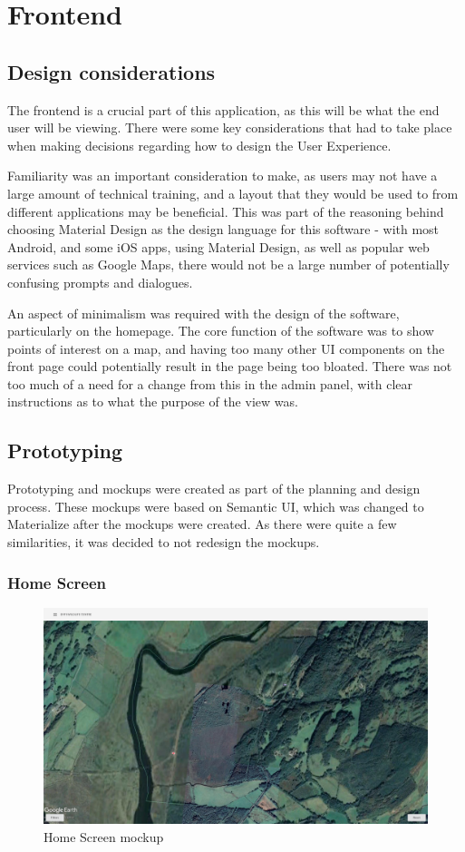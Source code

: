 \section{Frontend}
\label{sec:frontend}

\subsection{Design considerations}

The frontend is a crucial part of this application, as this will be what the end user will be viewing. There were some key considerations that had to take place when making decisions regarding how to design the User Experience.

Familiarity was an important consideration to make, as users may not have a large amount of technical training, and a layout that they would be used to from different applications may be beneficial. This was part of the reasoning behind choosing Material Design as the design language for this software - with most Android, and some iOS apps, using Material Design, as well as popular web services such as Google Maps, there would not be a large number of potentially confusing prompts and dialogues.

An aspect of minimalism was required with the design of the software, particularly on the homepage. The core function of the software was to show points of interest on a map, and having too many other UI components on the front page could potentially result in the page being too bloated. There was not too much of a need for a change from this in the admin panel, with clear instructions as to what the purpose of the view was.
\subsection{Prototyping}

Prototyping and mockups were created as part of the planning and design process. These mockups were based on Semantic UI, which was changed to Materialize after the mockups were created. As there were quite a few similarities, it was decided to not redesign the mockups.

\subsubsection{Home Screen}
\begin{figure}[!htbp]
\includegraphics[scale=0.2]{mockups/Home Screen}
\caption{Home Screen mockup}
\end{figure}


